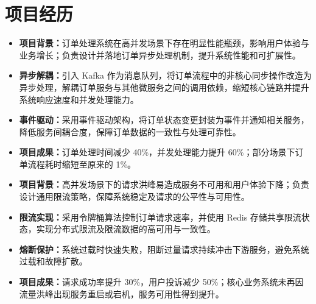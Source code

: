 \section{项目经历}

\begin{itemize}
  \item \textbf{项目背景：}订单处理系统在高并发场景下存在明显性能瓶颈，影响用户体验与业务增长；负责设计并落地订单异步处理机制，提升系统性能和可扩展性。
  \item \textbf{异步解耦：}引入 Kafka 作为消息队列，将订单流程中的非核心同步操作改造为异步处理，解耦订单服务与其他微服务之间的调用依赖，缩短核心链路并提升系统响应速度和并发处理能力。
  \item \textbf{事件驱动：}采用事件驱动架构，将订单状态变更封装为事件并通知相关服务，降低服务间耦合度，保障订单数据的一致性与处理可靠性。
  \item \textbf{项目成果：}订单处理时间减少 40\%，并发处理能力提升 60\%；部分场景下订单流程耗时缩短至原来的 1\%。
\end{itemize}

\vspace{1pt}
\begin{itemize}
  \item \textbf{项目背景：}高并发场景下的请求洪峰易造成服务不可用和用户体验下降；负责设计通用限流策略，保障系统稳定及请求的公平性与可用性。
  \item \textbf{限流实现：}采用令牌桶算法控制订单请求速率，并使用 Redis 存储共享限流状态，实现分布式限流及限流数据的高可用与一致性。
  \item \textbf{熔断保护：}系统过载时快速失败，阻断过量请求持续冲击下游服务，避免系统过载和故障扩散。
  \item \textbf{项目成果：}请求成功率提升 30\%，用户投诉减少 50\%；核心业务系统未再因流量洪峰出现服务重启或宕机，服务可用性得到提升。
\end{itemize}
